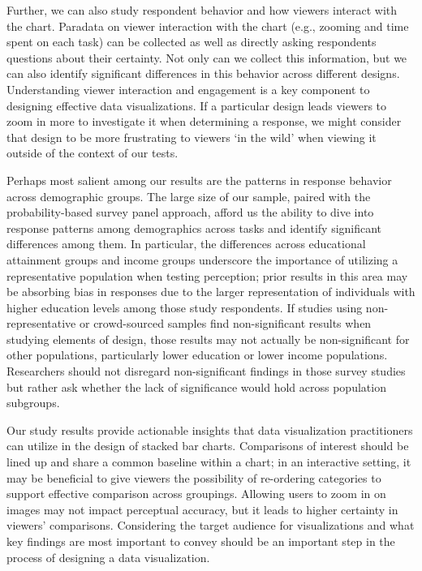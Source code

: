 \documentclass[
]{jds}
\begin{document}
Further, we can also study respondent behavior and how viewers interact
with the chart. Paradata on viewer interaction with the chart (e.g.,
zooming and time spent on each task) can be collected as well as
directly asking respondents questions about their certainty. Not only
can we collect this information, but we can also identify significant
differences in this behavior across different designs. Understanding
viewer interaction and engagement is a key component to designing
effective data visualizations. If a particular design leads viewers to
zoom in more to investigate it when determining a response, we might
consider that design to be more frustrating to viewers `in the wild'
when viewing it outside of the context of our tests.

Perhaps most salient among our results are the patterns in response
behavior across demographic groups. The large size of our sample, paired
with the probability-based survey panel approach, afford us the ability
to dive into response patterns among demographics across tasks and
identify significant differences among them. In particular, the
differences across educational attainment groups and income groups
underscore the importance of utilizing a representative population when
testing perception; prior results in this area may be absorbing bias in
responses due to the larger representation of individuals with higher
education levels among those study respondents. If studies using
non-representative or crowd-sourced samples find non-significant results
when studying elements of design, those results may not actually be
non-significant for other populations, particularly lower education or
lower income populations. Researchers should not disregard
non-significant findings in those survey studies but rather ask whether
the lack of significance would hold across population subgroups.

Our study results provide actionable insights that data visualization
practitioners can utilize in the design of stacked bar charts.
Comparisons of interest should be lined up and share a common baseline
within a chart; in an interactive setting, it may be beneficial to give
viewers the possibility of re-ordering categories to support effective
comparison across groupings. Allowing users to zoom in on images may not
impact perceptual accuracy, but it leads to higher certainty in viewers'
comparisons. Considering the target audience for visualizations and what
key findings are most important to convey should be an important step in
the process of designing a data visualization.
\end{document}

